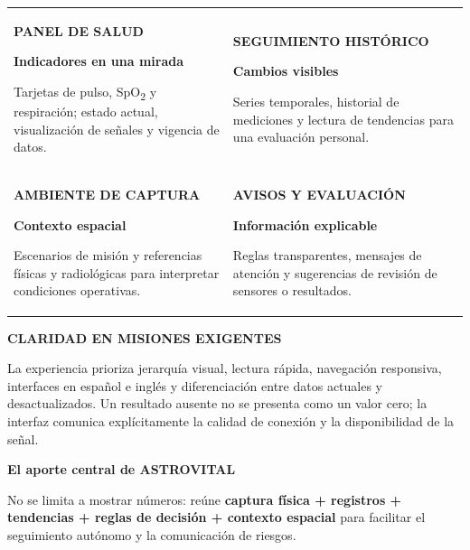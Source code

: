 \documentclass[10pt,a4paper]{article}
\newcommand{\heading}[2]{\par\vspace{8pt}{\large\bfseries\color{navy}#1}\hfill{\footnotesize\bfseries\color{blue}#2}\par\vspace{-1pt}{\color{blue}\rule{\linewidth}{1pt}}\vspace{3pt}}
\newcommand{\tinyhead}[1]{{\footnotesize\bfseries\color{blue}\MakeUppercase{#1}}}
\begin{document}
\par\noindent\begin{tabularx}{\linewidth}{@{}X@{\hspace{6mm}}X@{}}
\begin{infobox}\tinyhead{Panel de salud}\par\textbf{Indicadores en una mirada}\par Tarjetas de pulso, SpO\textsubscript{2} y respiración; estado actual, visualización de señales y vigencia de datos.\end{infobox}&
\begin{infobox}\tinyhead{Seguimiento histórico}\par\textbf{Cambios visibles}\par Series temporales, historial de mediciones y lectura de tendencias para una evaluación personal.\end{infobox}\\[5pt]
\begin{infobox}\tinyhead{Ambiente de captura}\par\textbf{Contexto espacial}\par Escenarios de misión y referencias físicas y radiológicas para interpretar condiciones operativas.\end{infobox}&
\begin{infobox}\tinyhead{Avisos y evaluación}\par\textbf{Información explicable}\par Reglas transparentes, mensajes de atención y sugerencias de revisión de sensores o resultados.\end{infobox}\\
\end{tabularx}\par
\heading{05  Criterios de diseño}{CLARIDAD EN MISIONES EXIGENTES}
La experiencia prioriza jerarquía visual, lectura rápida, navegación responsiva, interfaces en español e inglés y diferenciación entre datos actuales y desactualizados. Un resultado ausente no se presenta como un valor cero; la interfaz comunica explícitamente la calidad de conexión y la disponibilidad de la señal.
\begin{navybox}
{\color{white}\bfseries El aporte central de ASTROVITAL}\par{\color{white}No se limita a mostrar números: reúne \textbf{captura física + registros + tendencias + reglas de decisión + contexto espacial} para facilitar el seguimiento autónomo y la comunicación de riesgos.}
\end{navybox}
\end{document}
